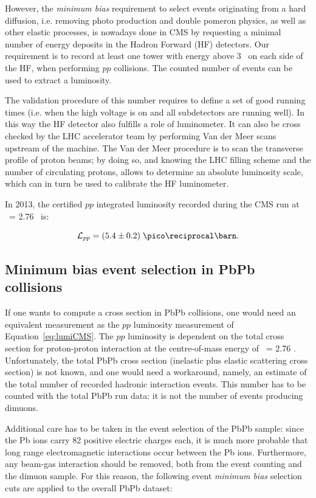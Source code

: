 However, the \textit{minimum bias} requirement to select events
originating from a hard diffusion, i.e. removing photo production and
double pomeron physics, as well as other elastic processes, is
nowadays done in CMS by requesting a minimal number of energy deposits
in the Hadron Forward (HF) detectors. Our requirement is to record at
least one tower with energy above 3 \GeV\ on each side of the HF, when
performing $pp$ collisions. The counted number of events can be used
to extract a luminosity.


The validation procedure of this number requires to define a set of
good running times (i.e. when the high voltage is on and all
subdetectors are running well). In this way the HF detector also
fulfills a role of luminometer. It can also be cross checked by the
LHC accelerator team by performing Van der Meer scans upstream of the
machine. The Van der Meer procedure is to scan the transverse profile
of proton beams; by doing so, and knowing the LHC filling scheme and
the number of circulating protons, allows to determine an absolute
luminosity scale, which can in turn be used to calibrate the HF
luminometer.

In 2013, the certified $pp$ integrated luminosity recorded during the CMS run at
\s\ = 2.76 \TeV\ is:

\begin{equation}
\mathcal{L}_{pp} = (5.4 \pm 0.2)\; \invpb.
\label{eq:lumiCMS}
\end{equation}
\subsection{Minimum bias event selection in PbPb collisions}
\label{sec:minbias}
If one wants to compute a cross section in PbPb collisions, one would need an
equivalent measurement as the $pp$ luminosity measurement of
Equation~\ref{eq:lumiCMS}. The $pp$ luminosity is dependent on the
total cross section for proton-proton interaction at the
centre-of-mass energy of \s\ = 2.76 \TeV. 
\\
Unfortunately, the total PbPb cross section (inelastic plus elastic scattering cross
section) is not known, and one would need a workaround,
namely, an estimate of the total number of recorded hadronic
interaction events. This number has to be counted with the total PbPb
run data: it is not the number of events producing dimuons. 

Additional care has to be taken in the event selection of the PbPb sample:
since the Pb ions carry 82 positive electric charges each, it is much
more probable that long range electromagnetic interactions occur
between the Pb ions. Furthermore, any beam-gas interaction should be
removed, both from the event counting and the dimuon sample. For this
reason, the following event \textit{minimum bias} selection cuts are
applied to the overall PbPb dataset:


